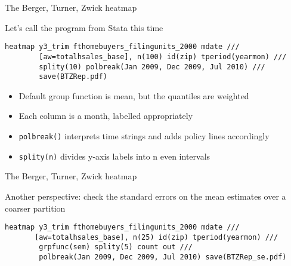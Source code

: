 \begin{frame}[fragile]{The Berger, Turner, Zwick heatmap}

Let's call the program from Stata this time

\footnotesize

\begin{verbatim}
heatmap y3_trim fthomebuyers_filingunits_2000 mdate ///
        [aw=totalhsales_base], n(100) id(zip) tperiod(yearmon) ///
        splity(10) polbreak(Jan 2009, Dec 2009, Jul 2010) ///
        save(BTZRep.pdf) 
\end{verbatim}

\normalsize
\begin{itemize}
        \item<1-> Default group function is mean, but the quantiles are weighted
        \item<2-> Each column is a month, labelled appropriately
        \item<3-> \texttt{polbreak()} interprets time strings and adds policy lines accordingly
        \item<4-> \texttt{splity(n)} divides y-axis labels into n even intervals
\end{itemize}


\end{frame}

\begin{frame}[fragile]{The Berger, Turner, Zwick heatmap}

\footnotesize

Another perspective: check the standard errors on the mean estimates over a coarser partition

\begin{verbatim}
heatmap y3_trim fthomebuyers_filingunits_2000 mdate ///
       [aw=totalhsales_base], n(25) id(zip) tperiod(yearmon) ///
        grpfunc(sem) splity(5) count out ///
        polbreak(Jan 2009, Dec 2009, Jul 2010) save(BTZRep_se.pdf)
\end{verbatim}

    \vspace{0.03in}
    \centering
\end{frame}




